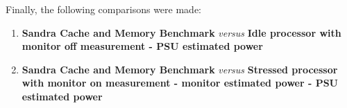             Finally, the following comparisons were made:

            \begin{enumerate}
                \item \textbf{Sandra Cache and Memory Benchmark} \emph{versus} \textbf{Idle processor with monitor off measurement - PSU estimated power}
                \item \textbf{Sandra Cache and Memory Benchmark} \emph{versus} \textbf{Stressed processor with monitor on measurement - monitor estimated power - PSU estimated power}
            \end{enumerate}



